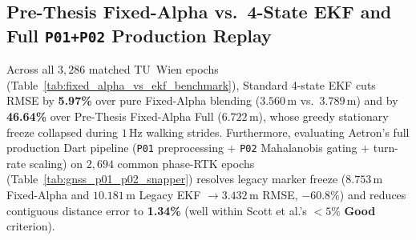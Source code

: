 \begin{table}[htbp]
\centering
\caption{Isolated Gate~3 GNSS Filtering Benchmark on TU Wien Dataset vs.\ Leica GS18 RTK Truth ($1{,}680$ Epochs).}
\label{tab:tu_wien_gps_benchmark}
\end{table}

\subsection{Pre-Thesis Fixed-Alpha vs.\ 4-State EKF and Full \texttt{P01+P02} Production Replay}
Across all $3{,}286$ matched TU~Wien epochs (Table~\ref{tab:fixed_alpha_vs_ekf_benchmark}), Standard 4-state EKF cuts RMSE by \textbf{5.97\%} over pure Fixed-Alpha blending ($3.560$\,m vs.\ $3.789$\,m) and by \textbf{46.64\%} over Pre-Thesis Fixed-Alpha Full ($6.722$\,m), whose greedy stationary freeze collapsed during $1$\,Hz walking strides. Furthermore, evaluating Aetron's full production Dart pipeline (\texttt{P01} preprocessing + \texttt{P02} Mahalanobis gating + turn-rate scaling) on $2{,}694$ common phase-RTK epochs (Table~\ref{tab:gnss_p01_p02_snapper}) resolves legacy marker freeze ($8.753$\,m Fixed-Alpha and $10.181$\,m Legacy EKF $\to \mathbf{3.432}$\,m RMSE, $-60.8\%$) and reduces contiguous distance error to \textbf{1.34\%} (well within Scott et al.'s $<5\%$ \textbf{Good} criterion).

